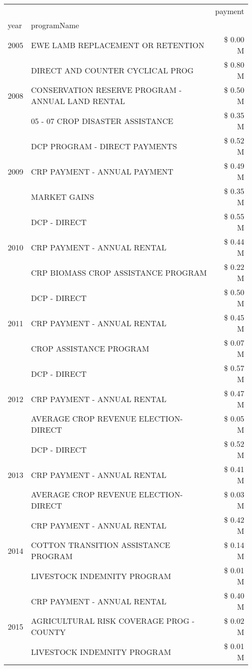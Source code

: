 \begin{tabular}{llr}
\toprule
 &  & payment \\
year & programName &  \\
\midrule
2005 & EWE LAMB REPLACEMENT OR RETENTION & \$ 0.00 M \\
\cline{1-3}
\multirow[t]{3}{*}{2008} & DIRECT AND COUNTER CYCLICAL PROG & \$ 0.80 M \\
 & CONSERVATION RESERVE PROGRAM - ANNUAL LAND RENTAL & \$ 0.50 M \\
 & 05 - 07 CROP DISASTER ASSISTANCE & \$ 0.35 M \\
\cline{1-3}
\multirow[t]{3}{*}{2009} & DCP PROGRAM - DIRECT PAYMENTS & \$ 0.52 M \\
 & CRP PAYMENT - ANNUAL PAYMENT & \$ 0.49 M \\
 & MARKET GAINS & \$ 0.35 M \\
\cline{1-3}
\multirow[t]{3}{*}{2010} & DCP - DIRECT & \$ 0.55 M \\
 & CRP PAYMENT - ANNUAL RENTAL & \$ 0.44 M \\
 & CRP BIOMASS CROP ASSISTANCE PROGRAM & \$ 0.22 M \\
\cline{1-3}
\multirow[t]{3}{*}{2011} & DCP - DIRECT & \$ 0.50 M \\
 & CRP PAYMENT - ANNUAL RENTAL & \$ 0.45 M \\
 & CROP ASSISTANCE PROGRAM & \$ 0.07 M \\
\cline{1-3}
\multirow[t]{3}{*}{2012} & DCP - DIRECT & \$ 0.57 M \\
 & CRP PAYMENT - ANNUAL RENTAL & \$ 0.47 M \\
 & AVERAGE CROP REVENUE ELECTION-DIRECT & \$ 0.05 M \\
\cline{1-3}
\multirow[t]{3}{*}{2013} & DCP - DIRECT & \$ 0.52 M \\
 & CRP PAYMENT - ANNUAL RENTAL & \$ 0.41 M \\
 & AVERAGE CROP REVENUE ELECTION-DIRECT & \$ 0.03 M \\
\cline{1-3}
\multirow[t]{3}{*}{2014} & CRP PAYMENT - ANNUAL RENTAL & \$ 0.42 M \\
 & COTTON TRANSITION ASSISTANCE PROGRAM & \$ 0.14 M \\
 & LIVESTOCK INDEMNITY PROGRAM & \$ 0.01 M \\
\cline{1-3}
\multirow[t]{3}{*}{2015} & CRP PAYMENT - ANNUAL RENTAL & \$ 0.40 M \\
 & AGRICULTURAL RISK COVERAGE PROG - COUNTY & \$ 0.02 M \\
 & LIVESTOCK INDEMNITY PROGRAM & \$ 0.01 M \\

\end{tabular}
